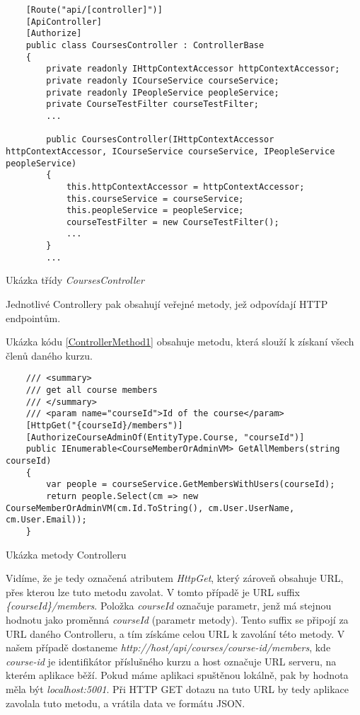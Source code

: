 \begin{program}
	\begin{lstlisting}
	[Route("api/[controller]")]
	[ApiController]
	[Authorize]
	public class CoursesController : ControllerBase
	{
		private readonly IHttpContextAccessor httpContextAccessor;
		private readonly ICourseService courseService;
		private readonly IPeopleService peopleService;
		private CourseTestFilter courseTestFilter;
		...
		
		public CoursesController(IHttpContextAccessor httpContextAccessor, ICourseService courseService, IPeopleService peopleService)
		{
			this.httpContextAccessor = httpContextAccessor;
			this.courseService = courseService;
			this.peopleService = peopleService;
			courseTestFilter = new CourseTestFilter();
			...
		}
		...
	\end{lstlisting}
	\caption{Ukázka třídy \textit{CoursesController}}
	\label{CoursesController}
\end{program}

Jednotlivé Controllery pak obsahují veřejné metody, jež odpovídají HTTP endpointům.

Ukázka kódu \ref{ControllerMethod1} obsahuje metodu, která slouží k získaní všech členů daného kurzu.

\begin{program}
	\begin{lstlisting}
	/// <summary>
	/// get all course members
	/// </summary>
	/// <param name="courseId">Id of the course</param>
	[HttpGet("{courseId}/members")]
	[AuthorizeCourseAdminOf(EntityType.Course, "courseId")]
	public IEnumerable<CourseMemberOrAdminVM> GetAllMembers(string courseId)
	{
		var people = courseService.GetMembersWithUsers(courseId);
		return people.Select(cm => new CourseMemberOrAdminVM(cm.Id.ToString(), cm.User.UserName, cm.User.Email));
	}
	\end{lstlisting}
	\caption{Ukázka metody Controlleru}
	\label{ControllerMethod1}
\end{program}

Vidíme, že je tedy označená atributem \textit{HttpGet}, který zároveň obsahuje URL, přes kterou lze tuto metodu zavolat. V tomto případě je URL suffix \textit{\{courseId\}/members}. Položka \textit{courseId} označuje parametr, jenž má stejnou hodnotu jako proměnná \textit{courseId} (parametr metody). Tento suffix se připojí za URL daného Controlleru, a tím získáme celou URL k zavolání této metody. V našem případě dostaneme
\newline
\textit{http://host/api/courses/course-id/members}, kde \textit{course-id} je identifikátor příslušného kurzu a host označuje URL serveru, na kterém aplikace běží. Pokud máme aplikaci spuštěnou lokálně, pak by hodnota měla být \textit{localhost:5001}. Při HTTP GET dotazu na tuto URL by tedy aplikace zavolala tuto metodu, a vrátila data ve formátu JSON.

